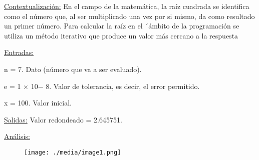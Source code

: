 \documentclass[12pt]{article}
\renewcommand{\_}{\kern-1.5pt\textunderscore\kern-1.5pt}
\begin{document}
\begin{enumerate}
\vspace{\baselineskip}
\begin{justify}
\uline{Contextualización:} En el campo de la matemática, la raíz cuadrada se identifica como el número que, al ser multiplicado una vez por si mismo, da como resultado un primer número. Para calcular la raíz en el ´ámbito de la programación se utiliza un método iterativo que produce un valor más cercano a la respuesta
\end{justify}\par

\begin{justify}
\uline{Entradas:} 
\end{justify}\par

\begin{justify}
n = 7. Dato (número que va a ser evaluado). 
\end{justify}\par

\begin{justify}
e = 1 $ \times $  10$-$ 8. Valor de tolerancia, es decir, el error permitido. 
\end{justify}\par

\begin{justify}
x = 100. Valor inicial. 
\end{justify}\par

\begin{justify}
\uline{Salidas:} Valor redondeado = 2.645751.
\end{justify}\par

\begin{justify}
\uline{Análisis:} 
\end{justify}\par




\begin{figure}[H]
	\begin{Center}
		\texttt{[image: ./media/image1.png]}
	\end{Center}
\end{figure}



\par




\end{enumerate}
\end{document}
